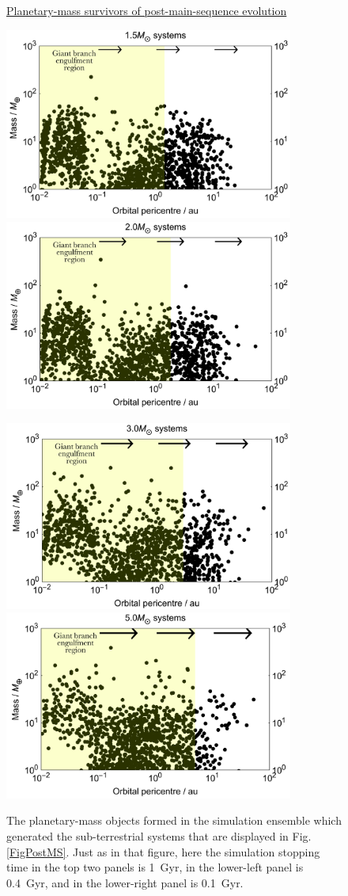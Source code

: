 \documentclass[useAMS,usenatbib]{mn2e}
\newcommand{\rev}{ }
\begin{document}
{%
\begin{figure}
\centerline{\Huge \underline{Planetary-mass survivors of post-main-sequence evolution}}
\centerline{}
\centerline{}
\centerline{
\includegraphics[width=9.5cm]{M15Massive}
\includegraphics[width=9.5cm]{M20Massive}
}
\centerline{}
\centerline{
\includegraphics[width=9.5cm]{M30Massive}
\includegraphics[width=9.5cm]{M50Massive}
}
\caption{
{\rev
The planetary-mass objects formed in the simulation ensemble which generated the sub-terrestrial systems that are displayed in Fig. \ref{FigPostMS}. Just as in that figure, here the simulation stopping time in the top two panels is 1~Gyr, in the lower-left panel is 0.4~Gyr, and in the lower-right panel is 0.1~Gyr.
}
}
\label{MassivePostMS}
\end{figure}


}
\end{document}

